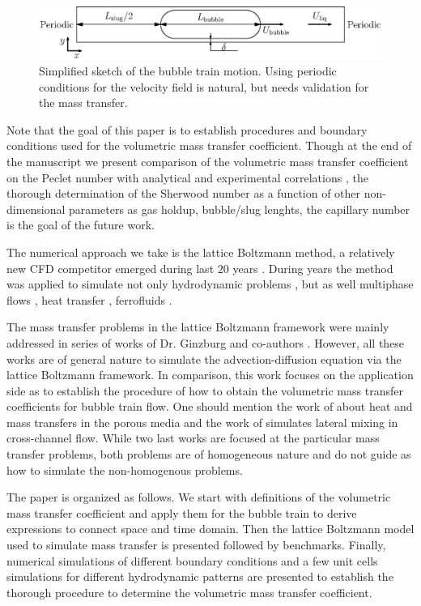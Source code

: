 \documentclass{article}
\begin{document}
\begin{figure}[htb!]
\includegraphics[width=\textwidth]{Figures/benchmark_hydro.eps}
\caption{Simplified sketch of the bubble train motion. Using periodic conditions for the velocity
field is natural, but needs validation for the mass transfer. \label{fig:benchmark:hydro}}
\end{figure}
Note that the goal of this paper is to establish procedures and boundary conditions used for the volumetric mass transfer coefficient. Though at the end of the manuscript we present comparison of the volumetric mass transfer coefficient on the Peclet number with analytical \cite{irandoust} and experimental correlations \cite{yue-mass}, the thorough
determination of the Sherwood number as a function of
other non-dimensional parameters as gas holdup, bubble/slug lenghts, the capillary number is the goal of the future work.
 
The numerical approach we take is the lattice Boltzmann method, a relatively new CFD
competitor emerged during last $20$ years \cite{frisch,mcnamara,HJ,HSB}. During years the
method was applied to simulate not only hydrodynamic problems \cite{yu}, but as well multiphase
flows \cite{Shan-chen:extended,swift,gunstensen}, heat transfer
\cite{yuan-thermal,zhang-thermal}, ferrofluids \cite{dellar-ferro,kuzmin-aniso}.

The mass transfer problems in the lattice Boltzmann framework were mainly addressed in series of
works of Dr. Ginzburg and co-authors
\cite{ginzburg-main,ginzburg-boundary-conditions,ginzburg-saturated-flow}. However, all these works
are of general nature to simulate the advection-diffusion equation via the lattice Boltzmann
framework. In comparison, this work focuses on the application side as to establish the procedure of how to obtain the
volumetric mass transfer coefficients for bubble train flow. One should mention the work of
\citet{inamuro-scalar-boundary} about heat and mass transfers in the porous media and the work
of \citet{jos-mass} simulates lateral mixing in cross-channel flow. While two last works are focused
at the particular mass transfer problems, both problems are of homogeneous nature and do not
guide as how to simulate the non-homogenous problems.           

The paper is organized as follows. We start with definitions of the volumetric mass transfer coefficient and apply them 
for the bubble train to derive expressions to connect space and time domain. Then the lattice
Boltzmann model used to simulate mass transfer is presented followed by benchmarks. Finally,
numerical simulations of different boundary conditions and a few unit cells simulations for
different hydrodynamic patterns are presented to establish the thorough procedure to determine the
volumetric mass transfer coefficient. 
\end{document}

